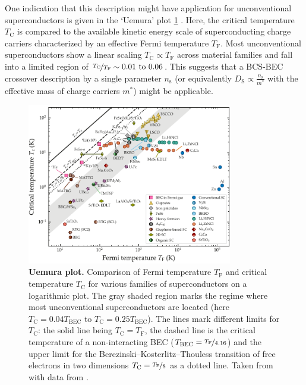 \documentclass[../main.tex]{subfiles}
\begin{document}
One indication that this description might have application for unconventional superconductors is given in the `Uemura' plot \cref{fig:Uemura plot} \cite{uemuraUniversalCorrelationsT_C1989, uemuraBasicSimilaritiesCuprate1991, uemuraCondensationExcitationPairing2004, uemuraDynamicSuperconductivityResponses2019a}.
Here, the critical temperature \(T_{\mathrm{C}}\) is compared to the available kinetic energy scale of superconducting charge carriers characterized by an effective Fermi temperature \(T_{\mathrm{F}}\).
Most unconventional superconductors show a linear scaling \(T_{\mathrm{C}} \propto T_{\mathrm{F}}\) across material families and fall into a limited region of \(\nicefrac{T_{\mathrm{C}}}{T_{\mathrm{F}}} \sim \numrange{0.01}{0.06}\).
This suggests that a BCS-BEC crossover description by a single parameter \(n_{\mathrm{s}}\) (or equivalently \(D_{\mathrm{S}} \propto \frac{n_{\mathrm{s}}}{m^*}\) with the effective mass of charge carriers \(m^*\)) might be applicable.

\begin{figure}[tb]
	\centering
	\includegraphics[width=0.8\textwidth]{images/Uemura_plot.pdf}
	\caption[Uemura plot.]{\textbf{Uemura plot.} 
		Comparison of Fermi temperature \(T_{\mathrm{F}}\) and critical temperature \(T_{\mathrm{C}}\) for various families of superconductors on a logarithmic plot.
		The gray shaded region marks the regime where most unconventional superconductors are located (here \(T_{\mathrm{C}} = 0.04 T_{\mathrm{BEC}}\) to \(T_{\mathrm{C}} = 0.25 T_{\mathrm{BEC}}\)).
		The lines mark different limits for \(T_{\mathrm{C}}\): the solid line being \(T_{\mathrm{C}} = T_{\mathrm{F}}\), the dashed line is the critical temperature of a non-interacting BEC (\(T_{\mathrm{BEC}} = \nicefrac{T_{\mathrm{F}}}{4.16}\)) and the upper limit for the Berezinski–Kosterlitz–Thouless transition of free electrons in two dimensions \(T_{\mathrm{C}} = \nicefrac{T_{\mathrm{F}}}{8}\) as a dotted line.
		Taken from \cite{wittElectronCorrelationsUnconventional} with data from \cite{nakagawaGatecontrolledBCSBECCrossover2021, uemuraDynamicSuperconductivityResponses2019, pantaleonSuperconductivityCorrelatedPhases2023a}.
	}
	\label{fig:Uemura plot}
\end{figure}
\end{document}
